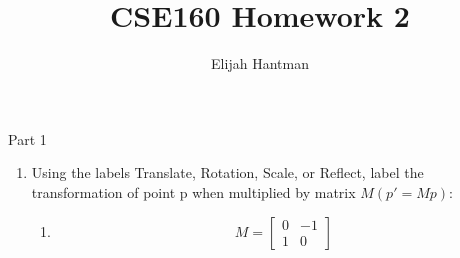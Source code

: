 \documentclass{article}
\title{CSE160 Homework 2}
\author{Elijah Hantman}
\begin{document}
    \maketitle

    {\large Part 1}
    \begin{enumerate}
        \item Using the labels Translate, Rotation, Scale, or Reflect, label the transformation of
            point p when multiplied by matrix $M(p' = Mp)$:

            \begin{enumerate}
                \item 
                    \begin{displaymath}
                        M = 
                        \begin{bmatrix}
                            0 & -1\\ 
                            1 & 0
                        \end{bmatrix}
                    \end{displaymath}


\end{enumerate}
\end{enumerate}
\end{document}
